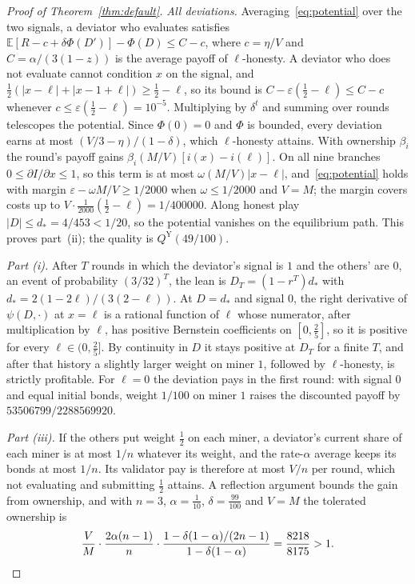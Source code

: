 \documentclass[sigconf,anonymous,review]{acmart}
\numberwithin{equation}{section}
\newcommand{\E}{\mathbb{E}}
\newcommand{\QY}{Q^{\mathrm{Y}}}
\begin{document}
\begin{proof}[Proof of Theorem~\ref{thm:default}]
\emph{All deviations.} Averaging~\eqref{eq:potential} over the two signals, a
deviator who evaluates satisfies $\E[R-c+\delta\Phi(D')]-\Phi(D)\le C-c$, where
$c=\eta/V$ and $C=\alpha/(3(1-z))$ is the average payoff of $\ell$-honesty. A
deviator who does not evaluate cannot condition $x$ on the signal, and
$\frac12(|x-\ell|+|x-1+\ell|)\ge\frac12-\ell$, so its bound is
$C-\varepsilon(\frac12-\ell)\le C-c$ whenever $c\le\varepsilon(\frac12-\ell)=10^{-5}$.
Multiplying by $\delta^t$ and summing over rounds telescopes the potential.
Since $\Phi(0)=0$ and $\Phi$ is bounded, every deviation earns at most
$(V/3-\eta)/(1-\delta)$, which $\ell$-honesty attains. With ownership
$\beta_i$ the round's payoff gains $\beta_i(M/V)[i(x)-i(\ell)]$. On all nine
branches $0\le\partial I/\partial x\le1$, so this term is at most
$\omega(M/V)|x-\ell|$, and~\eqref{eq:potential} holds with margin
$\varepsilon-\omega M/V\ge1/2000$ when $\omega\le1/2000$ and $V=M$; the margin
covers costs up to $V\cdot\frac1{2000}(\frac12-\ell)=1/400000$. Along honest play
$|D|\le d_*=4/453<1/20$, so the potential vanishes on the equilibrium path. This
proves part~(ii); the quality is $\QY(49/100)$.

\emph{Part (i).} After $T$ rounds in which the deviator's signal is $1$ and the
others' are $0$, an event of probability $(3/32)^T$, the lean is
$D_T=(1-r^T)d_*$ with $d_*=2(1-2\ell)/(3(2-\ell))$. At $D=d_*$ and signal $0$,
the right derivative of $\psi(D,\cdot)$ at $x=\ell$ is a rational function of
$\ell$ whose numerator, after multiplication by $\ell$, has positive Bernstein
coefficients on $[0,\frac25]$, so it is positive for every
$\ell\in(0,\frac25]$. By continuity in $D$ it stays positive at $D_T$ for a finite
$T$, and after that history a slightly larger weight on miner $1$, followed by
$\ell$-honesty, is strictly profitable. For $\ell=0$ the deviation pays in the
first round: with signal $0$ and equal initial bonds, weight $1/100$ on
miner $1$ raises the discounted payoff by $53506799/2288569920$.

\emph{Part (iii).} If the others put weight $\frac12$ on each miner, a
deviator's current share of each miner is at most $1/n$ whatever its weight,
and the rate-$\alpha$ average keeps its bonds at most $1/n$. Its validator pay is
therefore at most $V/n$ per round, which not evaluating and submitting $\frac12$
attains. A reflection argument bounds the gain from ownership, and with $n=3$,
$\alpha=\frac1{10}$, $\delta=\frac{99}{100}$ and $V=M$ the tolerated ownership is
\[
\frac VM\cdot\frac{2\alpha(n-1)}{n}\cdot\frac{1-\delta(1-\alpha)/(2n-1)}{1-\delta(1-\alpha)}=\frac{8218}{8175}>1.\qedhere
\]
\end{proof}
\end{document}
